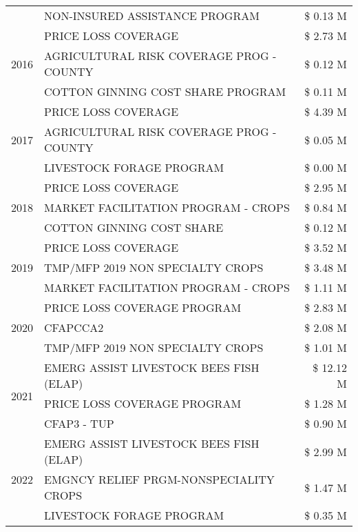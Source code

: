 \begin{tabular}{llr}
 & NON-INSURED ASSISTANCE PROGRAM & \$ 0.13 M \\
\cline{1-3}
\multirow[t]{3}{*}{2016} & PRICE LOSS COVERAGE & \$ 2.73 M \\
 & AGRICULTURAL RISK COVERAGE PROG - COUNTY & \$ 0.12 M \\
 & COTTON GINNING COST SHARE PROGRAM & \$ 0.11 M \\
\cline{1-3}
\multirow[t]{3}{*}{2017} & PRICE LOSS COVERAGE & \$ 4.39 M \\
 & AGRICULTURAL RISK COVERAGE PROG - COUNTY & \$ 0.05 M \\
 & LIVESTOCK FORAGE PROGRAM & \$ 0.00 M \\
\cline{1-3}
\multirow[t]{3}{*}{2018} & PRICE LOSS COVERAGE & \$ 2.95 M \\
 & MARKET FACILITATION PROGRAM - CROPS & \$ 0.84 M \\
 & COTTON GINNING COST SHARE & \$ 0.12 M \\
\cline{1-3}
\multirow[t]{3}{*}{2019} & PRICE LOSS COVERAGE & \$ 3.52 M \\
 & TMP/MFP 2019 NON SPECIALTY CROPS & \$ 3.48 M \\
 & MARKET FACILITATION PROGRAM - CROPS & \$ 1.11 M \\
\cline{1-3}
\multirow[t]{3}{*}{2020} & PRICE LOSS COVERAGE PROGRAM & \$ 2.83 M \\
 & CFAPCCA2 & \$ 2.08 M \\
 & TMP/MFP 2019 NON SPECIALTY CROPS & \$ 1.01 M \\
\cline{1-3}
\multirow[t]{3}{*}{2021} & EMERG ASSIST LIVESTOCK BEES FISH (ELAP) & \$ 12.12 M \\
 & PRICE LOSS COVERAGE PROGRAM & \$ 1.28 M \\
 & CFAP3 - TUP & \$ 0.90 M \\
\cline{1-3}
\multirow[t]{3}{*}{2022} & EMERG ASSIST LIVESTOCK BEES FISH (ELAP) & \$ 2.99 M \\
 & EMGNCY RELIEF PRGM-NONSPECIALITY CROPS & \$ 1.47 M \\
 & LIVESTOCK FORAGE PROGRAM & \$ 0.35 M \\
\cline{1-3}
\bottomrule
\end{tabular}
